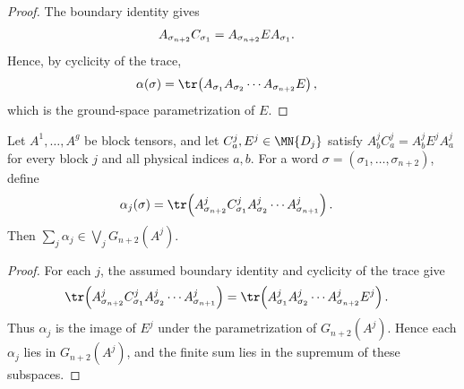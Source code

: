 \begin{proof}
    \leanok
    The boundary identity gives
    \begin{align}
        A_{\sigma_{n+2}} C_{\sigma_1}
         & =
        A_{\sigma_{n+2}}EA_{\sigma_1}.
        \notag
    \end{align}
    Hence, by cyclicity of the trace,
    \begin{align}
        \alpha(\sigma)
         & =
        \tr\!\left(A_{\sigma_1}A_{\sigma_2}\cdots A_{\sigma_{n+2}}E\right),
        \notag
    \end{align}
    which is the ground-space parametrization of $E$.
\end{proof}

\begin{lemma}
    \label{lem:left_boundary_summands_mem_block_ground_spaces}
    \leanok
    Let $A^1,\ldots,A^g$ be block tensors, and let
    $C^j_a,E^j\in\MN{D_j}$ satisfy
    $A^j_b C^j_a = A^j_bE^jA^j_a$
    for every block $j$ and all physical indices $a,b$. For a word
    $\sigma=(\sigma_1,\ldots,\sigma_{n+2})$, define
    \begin{align}
        \alpha_j(\sigma)
         & =
        \tr\!\left(A^j_{\sigma_{n+2}} C^j_{\sigma_1}
        A^j_{\sigma_2}\cdots A^j_{\sigma_{n+1}}\right).
        \notag
    \end{align}
    Then
    $\sum_j \alpha_j \in \bigvee_j G_{n+2}(A^j)$.
\end{lemma}

\begin{proof}
    \leanok
    For each $j$, the assumed boundary identity and cyclicity of the trace give
    \begin{align}
        \tr\!\left(A^j_{\sigma_{n+2}} C^j_{\sigma_1}
        A^j_{\sigma_2}\cdots A^j_{\sigma_{n+1}}\right)
         & =
        \tr\!\left(A^j_{\sigma_1}A^j_{\sigma_2}\cdots
        A^j_{\sigma_{n+2}}E^j\right).
        \notag
    \end{align}
    Thus $\alpha_j$ is the image of $E^j$ under the parametrization of
    $G_{n+2}(A^j)$. Hence each $\alpha_j$ lies in $G_{n+2}(A^j)$, and the
    finite sum lies in the supremum of these subspaces.
\end{proof}

